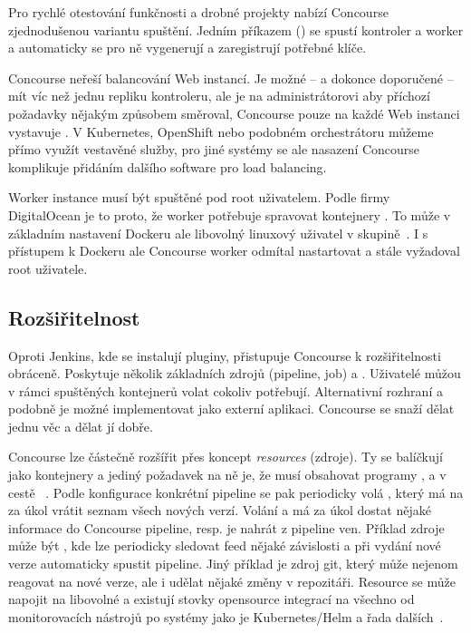         Pro rychlé otestování funkčnosti a drobné projekty nabízí Concourse zjednodušenou variantu spuštění. Jedním příkazem () se spustí kontroler a worker a automaticky se pro ně vygenerují a zaregistrují potřebné klíče.

        Concourse neřeší balancování Web instancí. Je možné -- a dokonce doporučené -- mít víc než jednu repliku kontroleru, ale je na administrátorovi aby příchozí požadavky nějakým způsobem směroval, Concourse pouze na každé Web instanci vystavuje  . V Kubernetes, OpenShift nebo podobném orchestrátoru můžeme přímo využít vestavěné služby, pro jiné systémy se ale nasazení Concourse komplikuje přidáním dalšího software pro load balancing.

        Worker instance musí být spuštěné pod root uživatelem. Podle firmy DigitalOcean je to proto, že worker potřebuje spravovat kontejnery . To může v základním nastavení Dockeru ale libovolný linuxový uživatel v  skupině~\cite{docker-postinstall}. I s přístupem k Dockeru ale Concourse worker odmítal nastartovat a stále vyžadoval root uživatele.

    \subsection{Rozšiřitelnost}
        Oproti Jenkins, kde se instalují pluginy, přistupuje Concourse k rozšiřitelnosti obráceně. Poskytuje několik základních zdrojů (pipeline, job) a . Uživatelé můžou v rámci spuštěných kontejnerů volat cokoliv potřebují. Alternativní rozhraní a podobně je možné implementovat jako externí aplikaci. Concourse se snaží dělat jednu věc a dělat jí dobře.

        Concourse lze částečně rozšířit přes koncept \textit{resources} (zdroje). Ty se balíčkují jako kontejnery a jediný požadavek na ně je, že musí obsahovat programy ,  a  v cestě ~\cite{concourse-resource}. Podle konfigurace konkrétní pipeline se pak periodicky volá , který má na za úkol vrátit seznam všech nových verzí. Volání  a  má za úkol dostat nějaké informace do Concourse pipeline, resp. je nahrát z pipeline ven. Příklad zdroje může být , kde lze periodicky sledovat feed nějaké závislosti a při vydání nové verze automaticky spustit pipeline. Jiný příklad je zdroj git, který může nejenom reagovat na nové verze, ale i udělat nějaké změny v repozitáři. Resource se může napojit na libovolné  a existují stovky opensource integrací na všechno od monitorovacích nástrojů po \CD systémy jako je Kubernetes/Helm a řada dalších~\cite{concourse-resource-list}.

